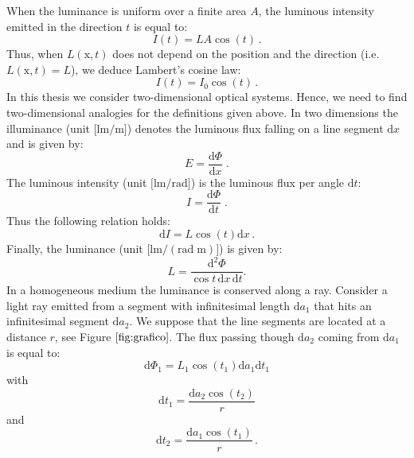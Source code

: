 When the luminance is uniform over a finite area $A$, the luminous intensity emitted in the direction $t$ is equal to:
\begin{equation}
I(t) = L A \cos(t)\,.
\end{equation}
Thus, when $L(\textrm{x},t)$ does not depend on the position and the direction (i.e. $L(\textrm{x},t)=L$), we deduce Lambert's cosine law:
\begin{equation}
I(t) = I_0\cos(t)\,.
\end{equation}
\indent In this thesis we consider two-dimensional optical systems. 
 Hence, we need to find two-dimensional analogies for the definitions given above.
In two dimensions the illuminance \big(unit $\big[\textrm{lm}/\textrm{m}\big]$\big) denotes the luminous flux falling on a line segment $\textrm{d}x$ and is given by:
 \begin{equation}
 E=\frac{\textrm{d}\Phi}{\textrm{d}x}\;.
 \end{equation}
 The luminous intensity \big(unit $\big[\textrm{lm}/\textrm{rad}\big]$\big) is the luminous flux per angle $\textrm{d}t$:
 \begin{equation}
 I=\frac{\textrm{d}\Phi}{\textrm{d}t}\;.
 \end{equation}
 Thus the following relation holds:
 \begin{equation}
 \textrm{d}I = L\cos(t)\textrm{d}x\,.
 \end{equation}
 Finally, the luminance \big(unit $\big[\textrm{lm}/(\textrm{rad}\; \textrm{m})\big]$\big) is given by:
 \begin{equation}
 L = \frac{\textrm {d}^2 \Phi}{\cos t\,\textrm{d}x \,\textrm{d}t}.
 \end{equation}
 \indent In a homogeneous medium the luminance is conserved along a ray.
Consider a light ray emitted from a segment with infinitesimal length $\textrm{d}a_1$ that hits an infinitesimal segment $\textrm{d}a_2$. %
We suppose that the line segments are located at a distance $r$, see Figure $\ref{fig:grafico}$. The flux passing though $\textrm{d}a_2$ coming from $\textrm{d}a_1$ is equal to:
\begin{equation}
\textrm{d}\Phi_1 = L_1 \cos(t_1) \textrm{d}a_1 \textrm{d}t_1
\end{equation}
with \begin{equation}
\textrm{d}t_1 = \frac{\textrm{d}a_2\cos(t_2)}{r}
\end{equation}
and
\begin{equation}
\textrm{d}t_2 = \frac{\textrm{d}a_1\cos(t_1)}{r}\,.
\end{equation}
